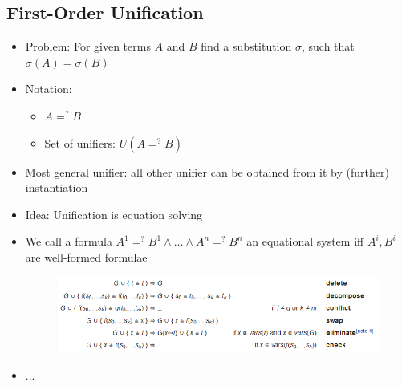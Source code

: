 \documentclass{scrartcl}
\begin{document}
\subsection{First-Order Unification}
\begin{itemize}
    \item
        Problem: For given terms $A$ and $B$ find a substitution $\sigma$, such that $\sigma(A) = \sigma(B)$
    \item
        Notation:
        \begin{itemize}
            \item 
                $A =^? B$
            \item
                Set of unifiers: $U(A =^? B)$
        \end{itemize}
    \item
        Most general unifier: all other unifier can be obtained from it by (further) instantiation\\
    \item
        Idea: Unification is equation solving
    \item
        We call a formula $A^1 =^? B^1 \land \dots \land A^n =^? B^n$ an equational system iff $A^i, B^i$ are well-formed formulae
    \begin{figure}[H]
        \centering
        \includegraphics[scale=1]{figures/unification}
    \end{figure} 

    \item
        ...
\end{itemize}
\end{document}
